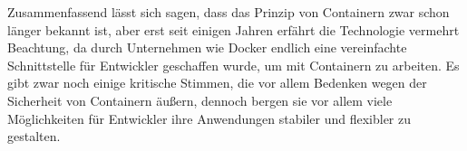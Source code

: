 \newpage

\noindent Zusammenfassend lässt sich sagen, dass das Prinzip von Containern zwar schon länger bekannt ist, aber erst seit einigen Jahren erfährt die Technologie vermehrt Beachtung, da durch Unternehmen wie Docker endlich eine vereinfachte Schnittstelle für Entwickler geschaffen wurde, um mit Containern zu arbeiten. Es gibt zwar noch einige kritische Stimmen, die vor allem Bedenken wegen der Sicherheit von Containern äußern, dennoch bergen sie vor allem viele Möglichkeiten für Entwickler ihre Anwendungen stabiler und flexibler zu gestalten.\\
%

